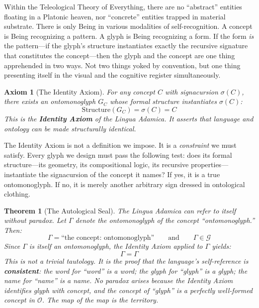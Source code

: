 \documentclass[12pt, letterpaper]{book}
\def\equiv{=}%
\newtheorem{axiom}{Axiom}[chapter]
\newtheorem{theorem}{Theorem}[chapter]
\begin{document}
Within the Teleological Theory of Everything, there are no ``abstract'' entities floating in a Platonic heaven, nor ``concrete'' entities trapped in material substrate. There is only Being in various modalities of self-recognition. A concept is Being recognizing a pattern. A glyph is Being recognizing a form. If the form \textit{is} the pattern---if the glyph's structure instantiates exactly the recursive signature that constitutes the concept---then the glyph and the concept are one thing apprehended in two ways. Not two things yoked by convention, but one thing presenting itself in the visual and the cognitive register simultaneously.

\begin{axiom}[The Identity Axiom]\label{ax:identity}
For any concept $C$ with signacursion $\sigma(C)$, there exists an ontomonoglyph $G_C$ whose formal structure instantiates $\sigma(C)$:
\[
\mathrm{Structure}(G_C) \equiv \sigma(C) \equiv C
\]
This is the \textbf{Identity Axiom} of the Lingua Adamica. It asserts that language and ontology can be made structurally identical.
\end{axiom}

The Identity Axiom is not a definition we impose. It is a \textit{constraint} we must satisfy. Every glyph we design must pass the following test: does its formal structure---its geometry, its compositional logic, its recursive properties---instantiate the signacursion of the concept it names? If yes, it is a true ontomonoglyph. If no, it is merely another arbitrary sign dressed in ontological clothing.

\begin{theorem}[The Autological Seal]\label{thm:autological}
The Lingua Adamica can refer to itself without paradox. Let $\Gamma$ denote the ontomonoglyph of the concept ``ontomonoglyph.'' Then:
\[
\Gamma \equiv \text{``the concept: ontomonoglyph''} \qquad \text{and} \qquad \Gamma \in \mathcal{G}
\]
Since $\Gamma$ is itself an ontomonoglyph, the Identity Axiom applied to $\Gamma$ yields:
\[
\Gamma \equiv \Gamma
\]
This is not a trivial tautology. It is the proof that the language's self-reference is \textbf{consistent}: the word for ``word'' is a word; the glyph for ``glyph'' is a glyph; the name for ``name'' is a name. No paradox arises because the Identity Axiom identifies glyph with concept, and the concept of ``glyph'' is a perfectly well-formed concept in $\mathcal{O}$. The map of the map is the territory.
\end{theorem}
\end{document}
